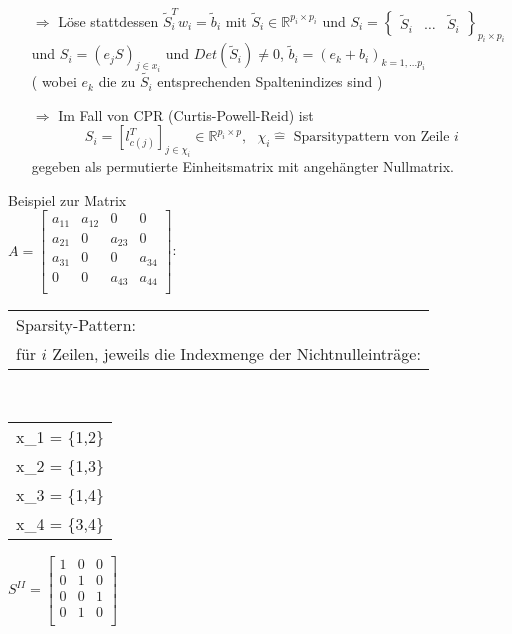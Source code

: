 \begin{itemize}
	\item[$\Rightarrow$] Löse stattdessen $\tilde{S}_i^Tw_i = \tilde{b}_i$
	mit
	$\tilde{S}_i \in \mathbb{R}^{p_i\times p_i}$
	und
	$S_i = \begin{Bmatrix}
	\tilde{S}_i & \dots & \tilde{S}_i\end{Bmatrix}_{p_i \times p_i}$ und  $S_i= (e_jS)_{j \in x_i}$
	und
	$Det(\tilde{S}_i)\neq 0$, $\tilde{b}_i = (e_k+b_i)_{k=1,\dots p_i}$\\
	( wobei
	$e_k$ die zu $\tilde{S_i}$ entsprechenden Spaltenindizes sind )\\
	
	\item[$\Rightarrow$] Im Fall von CPR (Curtis-Powell-Reid) ist\\
	$$S_i = \left[l^T_{c(j)}\right]_{j\in \chi_i}\in \mathbb{R}^{p_i\times p},\ \ \ \chi_i \hat{=} \text{ Sparsitypattern von Zeile } i$$
	gegeben als permutierte Einheitsmatrix mit angehängter Nullmatrix.
\end{itemize}
\newpage
\noindent
Beispiel zur Matrix\\
$A=\begin{bmatrix}
a_{11}	& a_{12}	& 0	& 0	\\
a_{21}	& 0	& a_{23}	& 0	\\
a_{31}	& 0	& 0	& a_{34}	\\
0	& 0	& a_{43}	& a_{44}\\
\end{bmatrix}$:
\begin{tabular}{l}
	Sparsity-Pattern:\\
	für $i$ Zeilen, jeweils die Indexmenge der Nichtnulleinträge:
\end{tabular}\\
\begin{tabular}{L}
	x_1 = \{1,2\}\\
	x_2 = \{1,3\}\\
	x_3 = \{1,4\}\\
	x_4 = \{3,4\}\\
\end{tabular}
$S^{II} = \begin{bmatrix}
1	& 0	& 0	\\
0	& 1	& 0	\\
0	& 0	& 1	\\
0	& 1	& 0	\\
\end{bmatrix}
$
